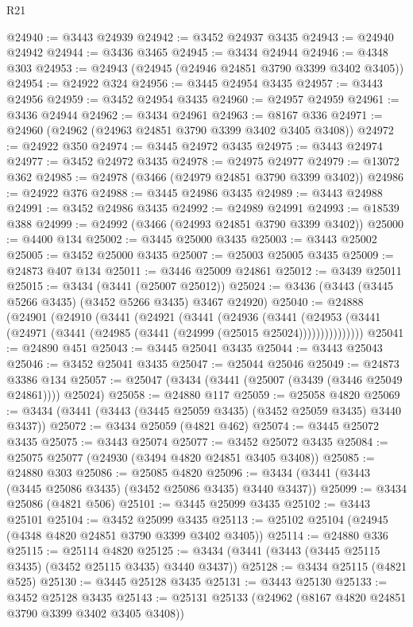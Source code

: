 \begin{lexlean}{R21}
\begin{coremodule}
@24940 := @3443 @24939
@24942 := @3452 @24937 @3435
@24943 := @24940 @24942
@24944 := @3436 @3465
@24945 := @3434 @24944
@24946 := @4348 @303
@24953 := @24943 (@24945 (@24946 @24851 @3790 @3399 @3402 @3405))
@24954 := @24922 @324
@24956 := @3445 @24954 @3435
@24957 := @3443 @24956
@24959 := @3452 @24954 @3435
@24960 := @24957 @24959
@24961 := @3436 @24944
@24962 := @3434 @24961
@24963 := @8167 @336
@24971 := @24960 (@24962 (@24963 @24851 @3790 @3399 @3402 @3405 @3408))
@24972 := @24922 @350
@24974 := @3445 @24972 @3435
@24975 := @3443 @24974
@24977 := @3452 @24972 @3435
@24978 := @24975 @24977
@24979 := @13072 @362
@24985 := @24978 (@3466 (@24979 @24851 @3790 @3399 @3402))
@24986 := @24922 @376
@24988 := @3445 @24986 @3435
@24989 := @3443 @24988
@24991 := @3452 @24986 @3435
@24992 := @24989 @24991
@24993 := @18539 @388
@24999 := @24992 (@3466 (@24993 @24851 @3790 @3399 @3402))
@25000 := @4400 @134
@25002 := @3445 @25000 @3435
@25003 := @3443 @25002
@25005 := @3452 @25000 @3435
@25007 := @25003 @25005 @3435
@25009 := @24873 @407 @134
@25011 := @3446 @25009 @24861
@25012 := @3439 @25011
@25015 := @3434 (@3441 (@25007 @25012))
@25024 := @3436 (@3443 (@3445 @5266 @3435) (@3452 @5266 @3435) @3467 @24920)
@25040 := @24888
    (@24901
      (@24910
        (@3441
          (@24921
            (@3441
              (@24936
                (@3441
                  (@24953 (@3441 (@24971 (@3441 (@24985 (@3441 (@24999 (@25015 @25024)))))))))))))))
@25041 := @24890 @451
@25043 := @3445 @25041 @3435
@25044 := @3443 @25043
@25046 := @3452 @25041 @3435
@25047 := @25044 @25046
@25049 := @24873 @3386 @134
@25057 := @25047 (@3434 (@3441 (@25007 (@3439 (@3446 @25049 @24861)))) @25024)
@25058 := @24880 @117
@25059 := @25058 @4820
@25069 := @3434 (@3441 (@3443 (@3445 @25059 @3435) (@3452 @25059 @3435) @3440 @3437))
@25072 := @3434 @25059 (@4821 @462)
@25074 := @3445 @25072 @3435
@25075 := @3443 @25074
@25077 := @3452 @25072 @3435
@25084 := @25075 @25077 (@24930 (@3494 @4820 @24851 @3405 @3408))
@25085 := @24880 @303
@25086 := @25085 @4820
@25096 := @3434 (@3441 (@3443 (@3445 @25086 @3435) (@3452 @25086 @3435) @3440 @3437))
@25099 := @3434 @25086 (@4821 @506)
@25101 := @3445 @25099 @3435
@25102 := @3443 @25101
@25104 := @3452 @25099 @3435
@25113 := @25102 @25104 (@24945 (@4348 @4820 @24851 @3790 @3399 @3402 @3405))
@25114 := @24880 @336
@25115 := @25114 @4820
@25125 := @3434 (@3441 (@3443 (@3445 @25115 @3435) (@3452 @25115 @3435) @3440 @3437))
@25128 := @3434 @25115 (@4821 @525)
@25130 := @3445 @25128 @3435
@25131 := @3443 @25130
@25133 := @3452 @25128 @3435
@25143 := @25131 @25133 (@24962 (@8167 @4820 @24851 @3790 @3399 @3402 @3405 @3408))

\end{coremodule}
\end{lexlean}
